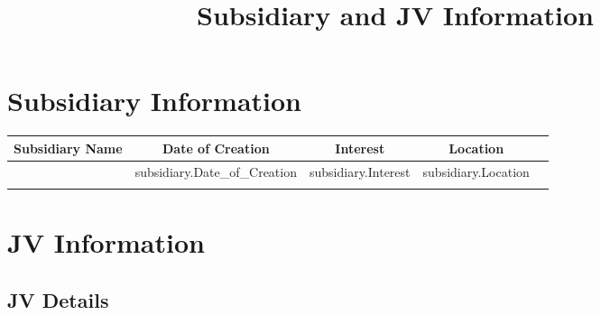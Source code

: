 \documentclass{article}
\begin{document}
\title{\textbf{Subsidiary and JV Information}}
\date{}
\maketitle

\section*{Subsidiary Information}
\begin{tabularx}{\textwidth}{|X|c|c|c|c|}
    \hline
    \rowcolor{blue!20}
    \textbf{Subsidiary Name} & \textbf{Date of Creation} & \textbf{Interest} & \textbf{Location} \\
    \hline
    {%
    {{ subsidiary.subsidiary_name }} & {{ subsidiary.Date_of_Creation }} & {{ subsidiary.Interest }} & {{ subsidiary.Location }} \\
    \hline
    {%
\end{tabularx}

\section*{JV Information}
\begin{tcolorbox}[colback=white]
\subsection*{JV Details}
\end{tcolorbox}
\end{document}

